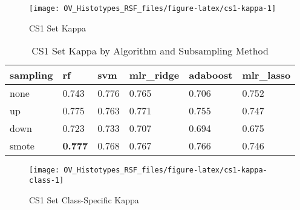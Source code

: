 \documentclass[
]{report}
\begin{document}
\begin{figure}[H]

{\centering \texttt{[image: OV\_Histotypes\_RSF\_files/figure-latex/cs1-kappa-1]} 

}

\caption{CS1 Set Kappa}\label{fig:cs1-kappa}
\end{figure}

\begin{table}

\caption{\label{tab:cs1-kappa-table}CS1 Set Kappa by Algorithm and Subsampling Method}
\centering
\begin{tabular}[t]{l|l|l|l|l|l}
\hline
sampling & rf & svm & mlr\_ridge & adaboost & mlr\_lasso\\
\hline
none & 0.743 & 0.776 & 0.765 & 0.706 & 0.752\\
\hline
up & 0.775 & 0.763 & 0.771 & 0.755 & 0.747\\
\hline
down & 0.723 & 0.733 & 0.707 & 0.694 & 0.675\\
\hline
smote & \textbf{0.777} & 0.768 & 0.767 & 0.766 & 0.746\\
\hline
\end{tabular}
\end{table}

\begin{figure}[H]

{\centering \texttt{[image: OV\_Histotypes\_RSF\_files/figure-latex/cs1-kappa-class-1]} 

}

\caption{CS1 Set Class-Specific Kappa}\label{fig:cs1-kappa-class}
\end{figure}
\end{document}

